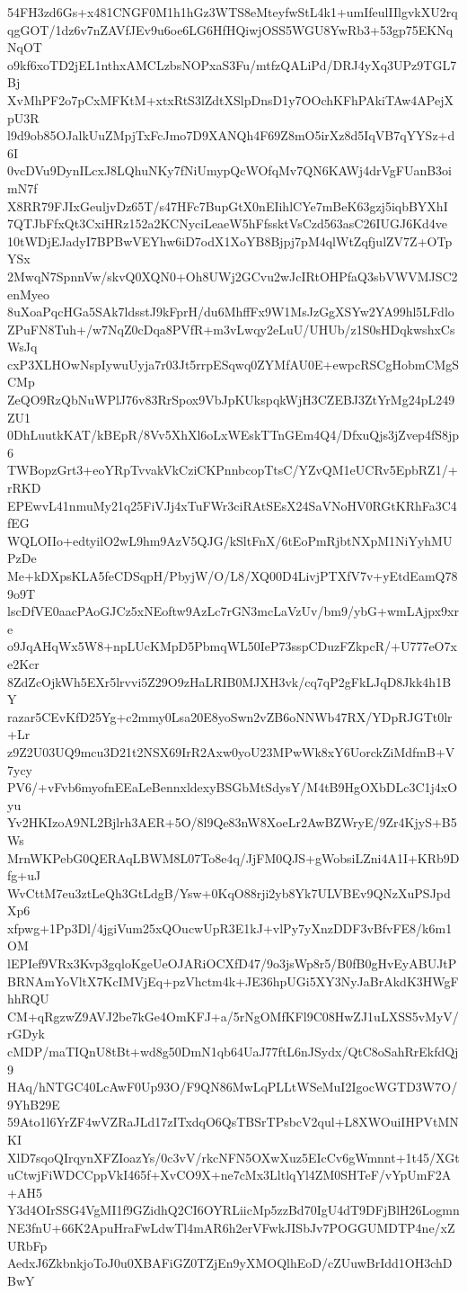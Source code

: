 54FH3zd6Gs+x481CNGF0M1h1hGz3WTS8eMteyfwStL4k1+umIfeulIIlgvkXU2rq
qgGOT/1dz6v7nZAVfJEv9u6oe6LG6HfHQiwjOSS5WGU8YwRb3+53gp75EKNqNqOT
o9kf6xoTD2jEL1nthxAMCLzbsNOPxaS3Fu/mtfzQALiPd/DRJ4yXq3UPz9TGL7Bj
XvMhPF2o7pCxMFKtM+xtxRtS3lZdtXSlpDnsD1y7OOchKFhPAkiTAw4APejXpU3R
l9d9ob85OJalkUuZMpjTxFcJmo7D9XANQh4F69Z8mO5irXz8d5IqVB7qYYSz+d6I
0vcDVu9DynILcxJ8LQhuNKy7fNiUmypQcWOfqMv7QN6KAWj4drVgFUanB3oimN7f
X8RR79FJIxGeuljvDz65T/s47HFc7BupGtX0nEIihlCYe7mBeK63gzj5iqbBYXhI
7QTJbFfxQt3CxiHRz152a2KCNyciLeaeW5hFfssktVsCzd563asC26IUGJ6Kd4ve
10tWDjEJadyI7BPBwVEYhw6iD7odX1XoYB8Bjpj7pM4qlWtZqfjulZV7Z+OTpYSx
2MwqN7SpnnVw/skvQ0XQN0+Oh8UWj2GCvu2wJcIRtOHPfaQ3sbVWVMJSC2enMyeo
8uXoaPqcHGa5SAk7ldsstJ9kFprH/du6MhffFx9W1MsJzGgXSYw2YA99hl5LFdlo
ZPuFN8Tuh+/w7NqZ0cDqa8PVfR+m3vLwqy2eLuU/UHUb/z1S0sHDqkwshxCsWsJq
cxP3XLHOwNspIywuUyja7r03Jt5rrpESqwq0ZYMfAU0E+ewpcRSCgHobmCMgSCMp
ZeQO9RzQbNuWPlJ76v83RrSpox9VbJpKUkspqkWjH3CZEBJ3ZtYrMg24pL249ZU1
0DhLuutkKAT/kBEpR/8Vv5XhXl6oLxWEskTTnGEm4Q4/DfxuQjs3jZvep4fS8jp6
TWBopzGrt3+eoYRpTvvakVkCziCKPnnbcopTtsC/YZvQM1eUCRv5EpbRZ1/+rRKD
EPEwvL41nmuMy21q25FiVJj4xTuFWr3ciRAtSEsX24SaVNoHV0RGtKRhFa3C4fEG
WQLOIIo+edtyilO2wL9hm9AzV5QJG/kSltFnX/6tEoPmRjbtNXpM1NiYyhMUPzDe
Me+kDXpsKLA5feCDSqpH/PbyjW/O/L8/XQ00D4LivjPTXfV7v+yEtdEamQ789o9T
lscDfVE0aacPAoGJCz5xNEoftw9AzLc7rGN3mcLaVzUv/bm9/ybG+wmLAjpx9xre
o9JqAHqWx5W8+npLUcKMpD5PbmqWL50IeP73sspCDuzFZkpcR/+U777eO7xe2Kcr
8ZdZcOjkWh5EXr5lrvvi5Z29O9zHaLRIB0MJXH3vk/cq7qP2gFkLJqD8Jkk4h1BY
razar5CEvKfD25Yg+c2mmy0Lsa20E8yoSwn2vZB6oNNWb47RX/YDpRJGTt0lr+Lr
z9Z2U03UQ9mcu3D21t2NSX69IrR2Axw0yoU23MPwWk8xY6UorckZiMdfmB+V7ycy
PV6/+vFvb6myofnEEaLeBennxldexyBSGbMtSdysY/M4tB9HgOXbDLc3C1j4xOyu
Yv2HKIzoA9NL2Bjlrh3AER+5O/8l9Qe83nW8XoeLr2AwBZWryE/9Zr4KjyS+B5Ws
MrnWKPebG0QERAqLBWM8L07To8e4q/JjFM0QJS+gWobsiLZni4A1I+KRb9Dfg+uJ
WvCttM7eu3ztLeQh3GtLdgB/Ysw+0KqO88rji2yb8Yk7ULVBEv9QNzXuPSJpdXp6
xfpwg+1Pp3Dl/4jgiVum25xQOucwUpR3E1kJ+vlPy7yXnzDDF3vBfvFE8/k6m1OM
lEPIef9VRx3Kvp3gqloKgeUeOJARiOCXfD47/9o3jsWp8r5/B0fB0gHvEyABUJtP
BRNAmYoVltX7KcIMVjEq+pzVhctm4k+JE36hpUGi5XY3NyJaBrAkdK3HWgFhhRQU
CM+qRgzwZ9AVJ2be7kGe4OmKFJ+a/5rNgOMfKFl9C08HwZJ1uLXSS5vMyV/rGDyk
cMDP/maTIQnU8tBt+wd8g50DmN1qb64UaJ77ftL6nJSydx/QtC8oSahRrEkfdQj9
HAq/hNTGC40LcAwF0Up93O/F9QN86MwLqPLLtWSeMuI2IgocWGTD3W7O/9YhB29E
59Ato1l6YrZF4wVZRaJLd17zITxdqO6QsTBSrTPsbcV2qul+L8XWOuiIHPVtMNKI
XlD7sqoQIrqynXFZIoazYs/0c3vV/rkcNFN5OXwXuz5EIcCv6gWmnnt+1t45/XGt
uCtwjFiWDCCppVkI465f+XvCO9X+ne7cMx3LltlqYl4ZM0SHTeF/vYpUmF2A+AH5
Y3d4OIrSSG4VgMI1f9GZidhQ2CI6OYRLiicMp5zzBd70IgU4dT9DFjBlH26Logmn
NE3fnU+66K2ApuHraFwLdwTl4mAR6h2erVFwkJISbJv7POGGUMDTP4ne/xZURbFp
AedxJ6ZkbnkjoToJ0u0XBAFiGZ0TZjEn9yXMOQlhEoD/cZUuwBrIdd1OH3chDBwY
